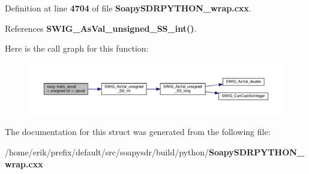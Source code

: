 Definition at line {\bf 4704} of file {\bf Soapy\+S\+D\+R\+P\+Y\+T\+H\+O\+N\+\_\+wrap.\+cxx}.



References {\bf S\+W\+I\+G\+\_\+\+As\+Val\+\_\+unsigned\+\_\+\+S\+S\+\_\+int()}.



Here is the call graph for this function\+:
\nopagebreak
\begin{figure}[H]
\begin{center}
\leavevmode
\includegraphics[width=350pt]{d7/d22/structswig_1_1traits__asval_3_01unsigned_01int_01_4_aa08c7b820ef056bf8f92b7982d4b1fab_cgraph}
\end{center}
\end{figure}




The documentation for this struct was generated from the following file\+:\begin{DoxyCompactItemize}
\item 
/home/erik/prefix/default/src/soapysdr/build/python/{\bf Soapy\+S\+D\+R\+P\+Y\+T\+H\+O\+N\+\_\+wrap.\+cxx}\end{DoxyCompactItemize}
